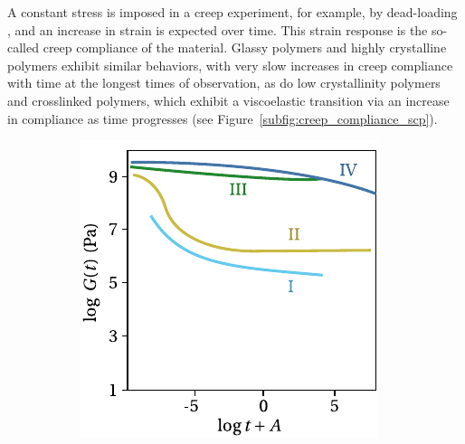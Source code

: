 A constant stress is imposed in a creep experiment, for example, by dead-loading \citep{wildingCreepRecoveryUltra1981}, and an increase in strain is expected over time.
This strain response is the so-called creep compliance of the material.
Glassy polymers and highly crystalline polymers exhibit similar behaviors, with very slow increases in creep compliance with time at the longest times of observation, as do low crystallinity polymers and crosslinked polymers, which exhibit a viscoelastic transition via an increase in compliance as time progresses \citep{ferryViscoelasticPropertiesPolymers1980} (see Figure~\ref{subfig:creep_compliance_scp}).
\begin{figure}[hbtp]
    \centering
    \begin{subfigure}[b]{0.45\textwidth}
                            \centering
                            \includegraphics[width=\textwidth]{figures/relax_modulus_scp}
                            \caption{}
                            \label{subfig:relax_modulus_scp}
            \end{subfigure} \hfill
            \begin{subfigure}[b]{0.45\textwidth}
                            \centering

\end{subfigure}
\end{figure}
